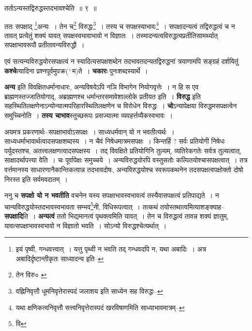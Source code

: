 \documentclass[article,12pt,a4paper]{memoir}
\newcommand{\add}[1]{($^{+}$#1)}
\begin{document}
	  \bigskip
	  \begingroup
	

	  \pstart ततोऽन्यस्तद्विरुद्धस्तदभावश्चेति ॥ ९ ॥
	\pend
      
	  \endgroup
	 

	  \pstart ततः सपक्षाद् \footnote{इयं पृष्वी, गन्धवत्त्वात् । यत्तु पृथ्वी न भवति तद् गन्धवदपि न, यथा अबादिः । अत्र अबादिर्दृष्टान्तीकृतः साध्यादन्य इति--\cite{dp-msD-n}}अन्यः । तेन च\footnote{तेन विरु० \cite{dp-msB}} विरुद्धः\footnote{वह्निनिवृत्तौ धूमनिवृत्तेरास्पदं जलाशय इति साध्येन सह विरुद्धः--\cite{dp-msD-n}} । तस्य च सपक्षस्याभावः\footnote{यथा क्षणिकत्वनिवृत्तौ सत्त्वनिवृत्तेरास्पदं खरविषाणमिति साध्याभावमात्रम्--\cite{dp-msD-n}} । सपक्षादन्यत्वं तद्विरुद्धत्वं च न तावत् प्रत्येतुं शक्यं यावत् सपक्षस्वभावाभावो न विज्ञातः । तस्मादन्यत्वविरुद्धत्वप्रतीतिसामर्थ्यात् सपक्षाभावरूपौ प्रतीतावन्यविरुद्धौ ।
	\pend
      
	  \endgroup
	

	  \pstart एवं सत्यन्यविरुद्धयोरसपक्षत्वं न स्यादित्यसपक्षशब्देन तदभावतदन्यतद्विरुद्धनां त्रयाणामपि सङ्ग्रहं दर्शयितुं \textbf{कश्चे}त्यादिना प्रश्नपूर्वमुपक्र\add{म}ते । \textbf{चकारः} पुनःशब्दस्यार्थे ।
	\pend
      

	  \pstart \textbf{अन्य} इति विवक्षितधर्मानाधारः, अन्यविषयेऽपि नञि विभागेन नियोगवृत्तेः । न हि स एव ब्राह्मणस्तज्जातियोगाद्, अब्राह्मणश्च धर्मान्तरसमावेशाल्लोके प्रतीयत इति । \textbf{विरुद्ध} इति सहस्थितिलक्षणेनाऽन्योन्यात्मपरिहारस्थितिलक्षणेन च विरोधेन विरुद्धः । \textbf{चो}ऽन्यापेक्षया विरुद्धमसपक्षत्वेन समुच्चिनोति । \textbf{तस्य चाभाव}स्तुच्छरूपः प्रसज्यात्मा व्यवहर्त्तव्यैकस्वभावः ।
	\pend
      

	  \pstart अयमत्र प्रकरणार्थः--सपक्षाभावोऽसपक्षः । साध्यधर्मवान् यो न भवतीत्यर्थः । साध्यधर्माभावार्थत्वादसपक्षशब्दस्य । न चैवं निषेधमात्रमसपक्षः । किन्तर्हि ? सर्वः प्रतियोगी निषेधः पर्युदस्तश्च, अतत्त्वलक्षणत्वादसपक्षस्य । तद् विवक्षिते प्रतियोगिनि तुल्यम्, व्यतिरेकगतेः सर्वत्र तुल्यत्वात्, साक्षादर्थापत्त्या वेति । चः पूर्वापेक्षः समुच्चये । अन्यविरुद्धयोरपि वस्तुसतोः कल्पितयोश्चासपक्षत्वात् । तत्र वर्त्तमानस्य साधारणानैकान्तिकत्वान्न तदभावदोषः, अन्यविरुद्धयोश्च स्वरूपकथनेन तदसपक्षत्वपक्षोक्तो दोषो निरस्त इति सर्वमवदातम् ।
	\pend
      

	  \pstart ननु च \textbf{सपक्षो यो न भवतीति} वचनेन यस्य सपक्षाभावस्वभावत्वं तस्यैवासपक्षत्वं \leavevmode{}प्रतिपाद्यते । न चान्यविरुद्धयोस्तदभावस्वभावता सम्भव\footnote{वि}नी, विधिरूपत्वात् । तत्कथं तयोस्तथात्वमित्याशङ्क्याह--\textbf{सपक्षादि}ति । \textbf{अन्यत्वं} ततो भिद्यमानत्वं पृथक्त्वमिति यावत् । तेन च विरुद्धत्वं तावन्न शक्यं ज्ञातुम्, यावत्सपक्षाभावस्वभावो न विज्ञातो भवति । सोऽन्यो विरुद्धश्चेत्यर्थात् ।
	\pend
      
\end{document}
